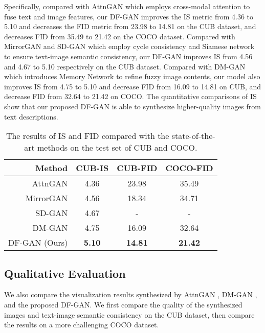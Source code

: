\documentclass[10pt,twocolumn,letterpaper]{article}
\begin{document}
Specifically, compared with AttnGAN \cite{xu2018attngan} which employs cross-modal attention to fuse text and image features, our DF-GAN improves the IS metric from 4.36 to 5.10 and decreases the FID metric from 23.98 to 14.81 on the CUB dataset, and decreases FID from 35.49 to 21.42 on the COCO dataset.
Compared with MirrorGAN \cite{qiao2019mirrorgan} and SD-GAN \cite{yin2019semantics} which employ cycle consistency and Siamese network to ensure text-image semantic consistency, our DF-GAN improves IS from 4.56 and 4.67 to 5.10 respectively on the CUB dataset.
Compared with DM-GAN \cite{zhu2019dm} which introduces Memory Network to refine fuzzy image contents, our model also improves IS from 4.75 to 5.10 and decrease  FID from 16.09 to 14.81 on CUB, and decrease FID from 32.64 to 21.42 on COCO.
The quantitative comparisons of IS show that our proposed DF-GAN is able to synthesize higher-quality images from text descriptions. 


\begin{table}[t] \small
\centering
\caption{The results of IS and FID compared with the state-of-the-art methods on the test set of CUB and COCO.}
\begin{tabular}{r|c|c|c}
\toprule
Method & CUB-IS & CUB-FID        & COCO-FID       \\ \midrule
AttnGAN \cite{xu2018attngan} & 4.36        & 23.98      & 35.49          \\
MirrorGAN \cite{qiao2019mirrorgan} &4.56   & 18.34      & 34.71       \\
SD-GAN \cite{yin2019semantics} &4.67       & -          & -       \\
DM-GAN  \cite{zhu2019dm} & 4.75            & 16.09      & 32.64                   \\
DF-GAN (Ours)   & \textbf{5.10}   & \textbf{14.81}       & \textbf{21.42} \\ \bottomrule
\end{tabular}
\label{table1}
\vspace{-0.4cm}
\end{table}

\subsection{Qualitative Evaluation}
We also compare the visualization results synthesized by AttnGAN \cite{xu2018attngan}, DM-GAN \cite{zhu2019dm}, and the proposed DF-GAN. 
We first compare the quality of the synthesized images and text-image semantic consistency on the CUB dataset, then compare the results on a more challenging COCO dataset.
\end{document}
